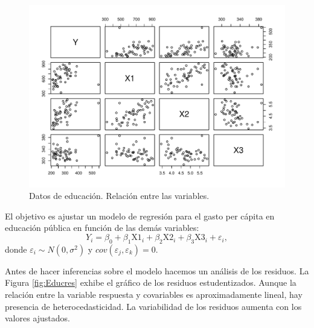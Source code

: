 \documentclass[
]{article}
\begin{document}
\begin{figure}

{\centering \includegraphics{MLGI_files/figure-latex/Educdata-1} 

}

\caption{Datos de educación. Relación entre las variables.}\label{fig:Educdata}
\end{figure}

El objetivo es ajustar un modelo de regresión para el gasto per cápita en educación pública en función de las demás variables:
\[
Y_{i} = \beta_{0} + \beta_{1}\mbox{X1}_{i} + \beta_{2}\mbox{X2}_{i}+ \beta_{3}\mbox{X3}_{i} + \varepsilon_{i},
\]
donde \(\varepsilon_{i}\sim N(0,\sigma^{2})\) y \(cov(\varepsilon_{j},\varepsilon_{k})=0\).

Antes de hacer inferencias sobre el modelo hacemos un análisis de los residuos. La Figura \ref{fig:Educres} exhibe el gráfico de los residuos estudentizados. Aunque la relación entre la variable respuesta y covariables es aproximadamente lineal, hay presencia de heterocedasticidad. La variabilidad de los residuos aumenta con los valores ajustados.
\end{document}
